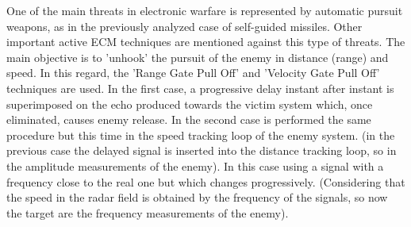 \documentclass[12pt]{report}
\begin{document}
One of the main threats in electronic warfare is represented by automatic pursuit weapons, as in the previously analyzed case of self-guided missiles. Other important active ECM techniques are mentioned against this type of threats. The main objective is to 'unhook' the pursuit of the enemy in distance (range) and speed. In this regard, the 'Range Gate Pull Off' and 'Velocity Gate Pull Off' techniques are used. In the first case, a progressive delay instant after instant is superimposed on the echo produced towards the victim system which, once eliminated, causes enemy release. In the second case is performed the same procedure but this time in the speed tracking loop of the enemy system. (in the previous case the delayed signal is inserted into the distance tracking loop, so in the amplitude measurements of the enemy). In this case using a signal with a frequency close to the real one but which changes progressively. (Considering that the speed in the radar field is obtained by the frequency of the signals, so now the target are the frequency measurements of the enemy).
\newpage
\end{document}
